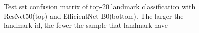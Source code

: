 \documentclass[10pt,twocolumn,letterpaper]{article}
\begin{document}
\begin{figure}
\begin{minipage}[t]{0.4\textwidth}
    \end{minipage}
    \caption{Test set confusion matrix of top-20 landmark classification with ResNet50(top) and EfficientNet-B0(bottom). The larger the landmark id, the fewer the sample that landmark have}
    \label{fig:cm_top20}
\end{figure}

{\small


}
\end{document}

